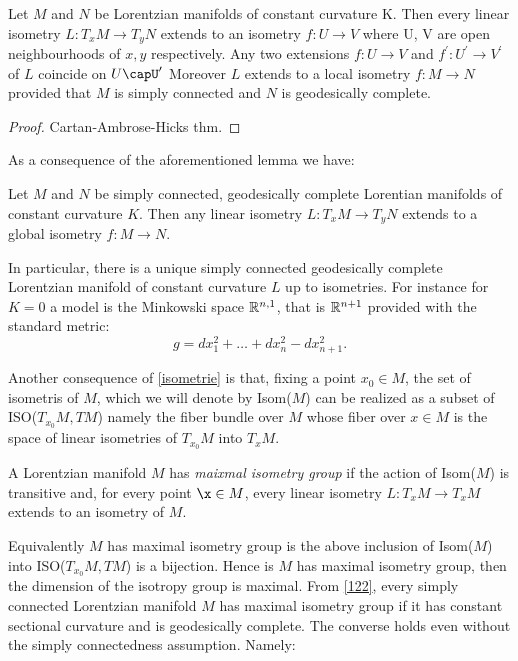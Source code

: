 \begin{lemma}\label{isometrie} Let $M$ and $N$ be Lorentzian manifolds of constant curvature K. Then every linear isometry $L:T_{x}M\to T_yN$ extends to an isometry $f:U\to V$ where U, V are open neighbourhoods of $x,y$ respectively. Any two extensions $f:U\to V$ and $f^{\prime}:U^{\prime} \to V^{\prime} $ of $L$ coincide on $U\capU^{\prime} $ Moreover $L$ extends to a local isometry $f:M\to N$ provided that $M$ is simply connected and $N$ is geodesically complete. 
\begin{proof}
    Cartan-Ambrose-Hicks thm.
\end{proof}
As a consequence of the aforementioned lemma we have: 
\begin{corollary}\label{122}
    Let $M$ and $N$ be simply connected, geodesically complete Lorentian manifolds of constant curvature $K$. Then any linear isometry $L:T_xM\to T_yN$ extends to a global isometry $f:M\to N.$   
\end{corollary}

In particular, there is a unique simply connected geodesically complete Lorentzian manifold of constant curvature $L$ up to isometries. For instance for $K=0$ a model is the Minkowski space $\mathbb{R}^{n,1}$, that is $\mathbb{R}^{n+1}$ provided with the standard metric: 
\[
    g=dx_1^{2}+\dots+dx_n^{2}-dx_{n+1}^2.   
\]

Another consequence of \ref{isometrie} is that, fixing a point $x_0 \in M$, the set of isometris of $M$, which we will denote by Isom($M$) can be realized as a subset of ISO($T_{x_0}M, TM$) namely the fiber bundle over $M$ whose fiber over $x\in M$ is the space of linear isometries of $T_{x_0}M$ into $T_{x}M$. 

\begin{definition}
    A Lorentzian manifold $M$ has \textit{maixmal isometry group} if the action of Isom($M$) is transitive and, for every point $\x \in M$, every linear isometry $L:T_{x}M\to T_xM$ extends to an isometry of $M$. 
\end{definition}

Equivalently $M$ has maximal isometry group is the above inclusion of Isom($M$) into ISO($T_{x_0}M, TM$) is a bijection. Hence is $M$ has maximal isometry group, then the dimension of the isotropy group is maximal. 
From \ref{122}, every simply connected Lorentzian manifold $M$ has maximal isometry group if it has constant sectional curvature and is geodesically complete. The converse holds even without the simply connectedness assumption. Namely: 


\end{lemma}
